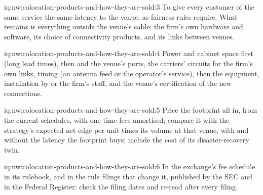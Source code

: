 \begin{solution}{iq:nw:colocation-products-and-how-they-are-sold:3}
To give every customer of the same service the same latency to the venue, as fairness rules require. What remains is everything outside the
venue's cable: the firm's own hardware and software, its choice of connectivity products, and its links between venues.
\end{solution}

\begin{solution}{iq:nw:colocation-products-and-how-they-are-sold:4}
Power and cabinet space first (long lead times), then  and the venue's ports, the carriers' circuits for the firm's own links,
timing (an antenna feed or the operator's service), then the equipment, installation by  or the firm's staff, and the venue's
certification of the new connections.
\end{solution}

\begin{solution}{iq:nw:colocation-products-and-how-they-are-sold:5}
Price the footprint all in, from the current schedules, with one-time fees amortised; compare it with the strategy's expected net edge per unit
times its volume at that venue, with and without the latency the footprint buys; include the cost of its disaster-recovery twin.
\end{solution}

\begin{solution}{iq:nw:colocation-products-and-how-they-are-sold:6}
In the exchange's fee schedule in its rulebook, and in the rule filings that change it, published by the SEC and in the Federal Register;
check the filing dates and re-read after every filing.
\end{solution}
